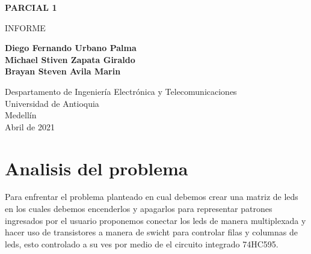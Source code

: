 \documentclass{article}
\begin{document}
\begin{titlepage}
    \begin{center}
        \vspace*{1cm}
            
        \Huge
        \textbf{PARCIAL 1}
            
        \vspace{0.5cm}
        \LARGE
        INFORME
            
        \vspace{1.5cm}
            
        \textbf{Diego Fernando Urbano Palma\\Michael Stiven Zapata Giraldo\\Brayan Steven Avila Marin}
            
        \vfill
            
        \vspace{0.8cm}
            
        \Large
        Despartamento de Ingeniería Electrónica y Telecomunicaciones\\
        Universidad de Antioquia\\
        Medellín\\
        Abril de 2021
            
    \end{center}
\end{titlepage}

\tableofcontents
\newpage
\section{ Analisis del problema }\label{intro}
Para enfrentar el problema planteado en cual debemos crear una matriz de leds en los cuales debemos encenderlos y apagarlos para representar patrones ingresados por el usuario proponemos conectar los leds de manera multiplexada y hacer uso de transistores a manera de swicht para controlar filas y columnas de leds, esto controlado a su ves por medio de el circuito integrado 74HC595.
\end{document}
